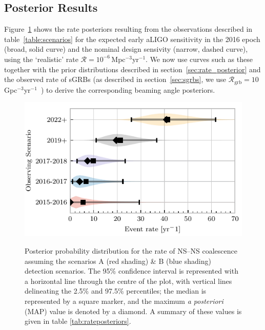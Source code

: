 \documentclass[twocolumn,nofootinbib]{revtex4-1}
\newcommand{\grbrate}{{{\mathcal R}_{\mathrm{grb}}}}
\newcommand{\cbcrate}{{{\mathcal R}}}
\newcommand{\latin}[1]{\textit{#1}}
\newcommand{\BNS}{\ac{NS}--\ac{NS}\xspace}
\begin{document}
\subsection{Posterior Results}
Figure~\ref{fig:aligorate} shows the rate posteriors resulting from
the observations described in table~\ref{table:scenarios} for the
expected early \ac{aLIGO} sensitivity in the 2016 epoch (broad, solid
curve) and the nominal design sensivity (narrow, dashed curve), using
the `realistic' rate $\cbcrate=10^{-6}$\,Mpc$^{-3}$yr$^{-1}$.
We now use curves such as these together with the prior distributions
described in section~\ref{sec:rate_posterior} and the observed rate of
\acp{sGRB} (as described in section~\ref{sec:sgrbs}, we use
$\grbrate=10$\,Gpc$^{-3}$yr$^{-1}$~\cite{Nakar:2007yr,Dietz:2010eh})
to derive the corresponding beaming angle posteriors.

\begin{figure}
\centering
{\includegraphics[width=\linewidth]{rate_posteriors_violin.pdf}}
\caption{Posterior probability distribution for the rate of \BNS
  coalescence assuming the scenarios A (red shading) \& B (blue
  shading) detection scenarios. The 95\% confidence interval is
  represented with a horizontal line through the centre of the plot,
  with vertical lines delineating the 2.5\% and 97.5\% percentiles;
  the median is represented by a square marker, and the maximum
  \latin{a posteriori} (\ac{MAP}) value is denoted by a diamond. A
  summary of these values is given in table
  \ref{tab:rateposteriors}. \label{fig:aligorate} }
\end{figure}
\end{document}

